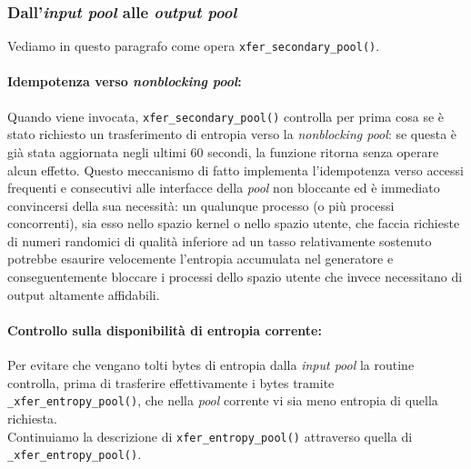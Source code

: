 \documentclass{article}
\begin{document}
 \subsubsection{Dall'\emph{input pool} alle \emph{output
 pool}}\label{trasf_input_output}
 Vediamo in questo paragrafo come opera \verb+xfer_secondary_pool()+.
 
 \paragraph{Idempotenza verso \emph{nonblocking pool}:}Quando viene invocata,
 \verb+xfer_secondary_pool()+ controlla per prima cosa se è stato richiesto un
 trasferimento di entropia verso la \emph{nonblocking pool}: se questa è già
 stata aggiornata negli ultimi 60 secondi, la funzione ritorna senza operare
 alcun effetto. Questo meccanismo di fatto implementa l'idempotenza verso
 accessi frequenti e consecutivi alle interfacce della \emph{pool} non
 bloccante ed è immediato convincersi della sua necessità: un qualunque processo
 (o più processi concorrenti), sia esso nello spazio
 kernel o nello spazio utente, che faccia richieste di numeri randomici di
 qualità inferiore ad un tasso relativamente sostenuto potrebbe esaurire
 velocemente l'entropia accumulata nel generatore e conseguentemente bloccare i
 processi dello spazio utente che invece necessitano di output altamente
 affidabili. 
 
 \paragraph{Controllo sulla disponibilità di entropia corrente:} Per evitare
 che vengano tolti bytes di entropia dalla \emph{input pool} la routine
 controlla, prima di trasferire effettivamente i bytes tramite
 \verb+_xfer_entropy_pool()+, che nella \emph{pool} corrente vi sia meno
 entropia di quella richiesta. \\Continuiamo la descrizione di
 \verb+xfer_entropy_pool()+ attraverso quella di \verb+_xfer_entropy_pool()+.
 
\end{document}
